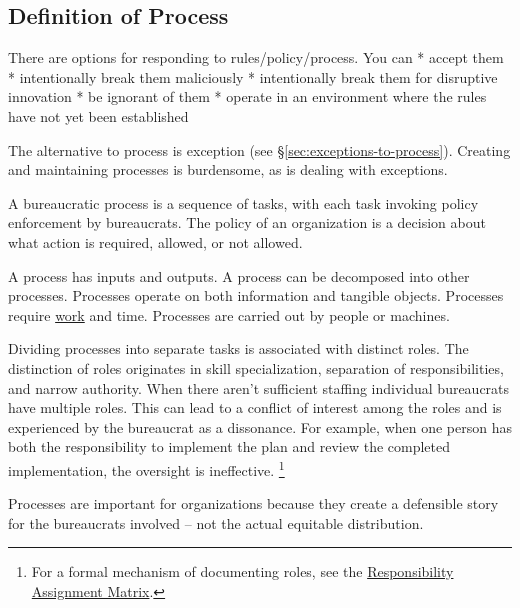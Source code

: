 \subsection{Definition of Process\label{sec:definition-of-process}}

There are options for responding to rules/policy/process. You can
* accept them
* intentionally break them maliciously
* intentionally break them for disruptive innovation
* be ignorant of them
* operate in an environment where the rules have not yet been established



The alternative to process is exception (see \S\ref{sec:exceptions-to-process}). Creating and maintaining processes is burdensome, as is dealing with exceptions. 


A bureaucratic \gls{process} is a sequence of tasks, with each task invoking policy enforcement by bureaucrats. 
The policy of an organization is a decision about what action is required, allowed, or not allowed.


A process has inputs and outputs. 
A process can be decomposed into other processes. 
Processes operate on both information and tangible objects. 
Processes require \href{https://en.wikipedia.org/wiki/Work_(physics)}{work} and time. 
Processes are carried out by people or machines.

Dividing processes into separate tasks is associated with distinct roles. The distinction of roles originates in skill specialization, separation of responsibilities, and narrow authority. 
When there aren't sufficient staffing individual bureaucrats have multiple roles. This can lead to a conflict of interest among the roles and is experienced by the bureaucrat as a dissonance. For example, when one person has both the responsibility to implement the plan and review the completed implementation, the oversight is ineffective. \footnote{For a formal mechanism of documenting roles, see the 
\href{https://en.wikipedia.org/wiki/Responsibility_assignment_matrix}{Responsibility Assignment Matrix}.
}


Processes are important for organizations because they create a defensible story for the bureaucrats involved -- not the actual equitable distribution.

